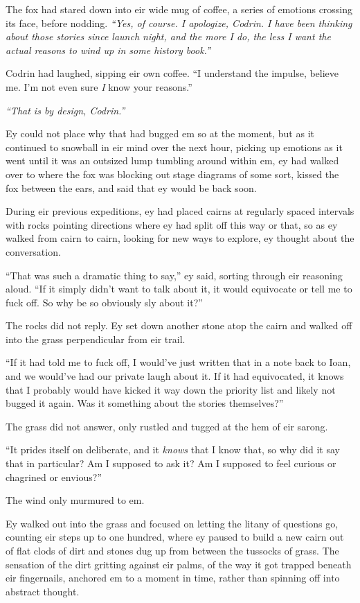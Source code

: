The fox had stared down into eir wide mug of coffee, a series of emotions crossing its face, before nodding. \emph{``Yes, of course. I apologize, Codrin. I have been thinking about those stories since launch night, and the more I do, the less I want the actual reasons to wind up in some history book.''}

Codrin had laughed, sipping eir own coffee. ``I understand the impulse, believe me. I'm not even sure \emph{I} know your reasons.''

\emph{``That is by design, Codrin.''}

Ey could not place why that had bugged em so at the moment, but as it continued to snowball in eir mind over the next hour, picking up emotions as it went until it was an outsized lump tumbling around within em, ey had walked over to where the fox was blocking out stage diagrams of some sort, kissed the fox between the ears, and said that ey would be back soon.

During eir previous expeditions, ey had placed cairns at regularly spaced intervals with rocks pointing directions where ey had split off this way or that, so as ey walked from cairn to cairn, looking for new ways to explore, ey thought about the conversation.

``That was such a dramatic thing to say,'' ey said, sorting through eir reasoning aloud. ``If it simply didn't want to talk about it, it would equivocate or tell me to fuck off. So why be so obviously sly about it?''

The rocks did not reply. Ey set down another stone atop the cairn and walked off into the grass perpendicular from eir trail.

``If it had told me to fuck off, I would've just written that in a note back to Ioan, and we would've had our private laugh about it. If it had equivocated, it knows that I probably would have kicked it way down the priority list and likely not bugged it again. Was it something about the stories themselves?''

The grass did not answer, only rustled and tugged at the hem of eir sarong.

``It prides itself on deliberate, and it \emph{knows} that I know that, so why did it say that in particular? Am I supposed to ask it? Am I supposed to feel curious or chagrined or envious?''

The wind only murmured to em.

Ey walked out into the grass and focused on letting the litany of questions go, counting eir steps up to one hundred, where ey paused to build a new cairn out of flat clods of dirt and stones dug up from between the tussocks of grass. The sensation of the dirt gritting against eir palms, of the way it got trapped beneath eir fingernails, anchored em to a moment in time, rather than spinning off into abstract thought.

